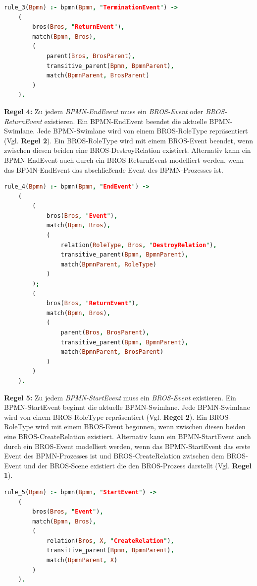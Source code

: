 \begin{lstlisting}[language=Prolog, caption=Regel 3]
rule_3(Bpmn) :- bpmn(Bpmn, "TerminationEvent") ->
    (
        bros(Bros, "ReturnEvent"), 
        match(Bpmn, Bros),
        (
            parent(Bros, BrosParent),
            transitive_parent(Bpmn, BpmnParent),
            match(BpmnParent, BrosParent)
        )
    ).
\end{lstlisting}

\textbf{Regel 4:} Zu jedem \emph{BPMN-EndEvent} muss ein \emph{BROS-Event} oder \emph{BROS-ReturnEvent} existieren.
Ein BPMN-EndEvent beendet die aktuelle BPMN-Swimlane.
Jede BPMN-Swimlane wird von einem BROS-RoleType repräsentiert (Vgl. \textbf{Regel 2}).
Ein BROS-RoleType wird mit einem BROS-Event beendet, wenn  zwischen diesen beiden eine BROS-DestroyRelation existiert.
Alternativ kann ein BPMN-EndEvent auch durch ein BROS-ReturnEvent modelliert werden, wenn das BPMN-EndEvent das abschließende Event des BPMN-Prozesses ist.

\begin{lstlisting}[language=Prolog, caption=Regel 4]
rule_4(Bpmn) :- bpmn(Bpmn, "EndEvent") ->
    (
        (
            bros(Bros, "Event"),
            match(Bpmn, Bros),
            (
                relation(RoleType, Bros, "DestroyRelation"),
                transitive_parent(Bpmn, BpmnParent),
                match(BpmnParent, RoleType)
            )
        );
        (
            bros(Bros, "ReturnEvent"), 
            match(Bpmn, Bros),
            (
                parent(Bros, BrosParent),
                transitive_parent(Bpmn, BpmnParent),
                match(BpmnParent, BrosParent)
            )
        )
    ).
\end{lstlisting}

\textbf{Regel 5:} Zu jedem \emph{BPMN-StartEvent} muss ein \emph{BROS-Event} existieren.
Ein BPMN-StartEvent beginnt die aktuelle BPMN-Swimlane.
Jede BPMN-Swimlane wird von einem BROS-RoleType repräsentiert (Vgl. \textbf{Regel 2}).
Ein BROS-RoleType wird mit einem BROS-Event begonnen, wenn  zwischen diesen beiden eine BROS-CreateRelation existiert.
Alternativ kann ein BPMN-StartEvent auch durch ein BROS-Event modelliert werden, wenn das BPMN-StartEvent das erste Event des BPMN-Prozesses ist und BROS-CreateRelation zwischen dem BROS-Event und der BROS-Scene existiert die den BROS-Prozess darstellt (Vgl. \textbf{Regel 1}).

\begin{lstlisting}[language=Prolog, caption=Regel 5]
rule_5(Bpmn) :- bpmn(Bpmn, "StartEvent") ->
    (
        bros(Bros, "Event"),
        match(Bpmn, Bros),
        (
            relation(Bros, X, "CreateRelation"),
            transitive_parent(Bpmn, BpmnParent),
            match(BpmnParent, X)
        )
    ).
\end{lstlisting}

